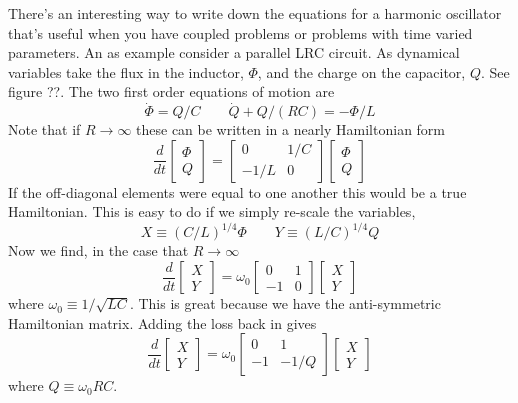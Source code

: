 
There's an interesting way to write down the equations for a harmonic oscillator that's useful when you have coupled problems or problems with time varied parameters.
An as example consider a parallel LRC circuit.
As dynamical variables take the flux in the inductor, $\Phi$, and the charge on the capacitor, $Q$.
See figure ??.
The two first order equations of motion are\begin{equation}
\dot{\Phi}=Q/C\qquad\dot{Q}+Q/(RC)=-\Phi/L \end{equation}
Note that if $R\rightarrow\infty$ these can be written in a nearly Hamiltonian form \begin{equation}
\frac{d}{dt}\left[ \begin{array}{c} \Phi \\ Q\end{array} \right] =
\left[\begin{array}{cc} 0 & 1/C \\ -1/L & 0 \end{array} \right]
\left[\begin{array}{c} \Phi\\ Q\end{array}\right] \end{equation}
If the off-diagonal elements were equal to one another this would be a true Hamiltonian.
This is easy to do if we simply re-scale the variables, \begin{equation}
X \equiv \left( C/L \right)^{1/4} \Phi \qquad Y \equiv \left( L/C \right)^{1/4} Q \end{equation}
Now we find, in the case that $R\rightarrow\infty$ \begin{displaymath}
\frac{d}{dt}\left[ \begin{array}{c} X \\ Y \end{array} \right] = \omega_{0} \left[ \begin{array}{cc} 0 & 1 \\ -1 & 0 \end{array}\right]
\left[ \begin{array}{c} X \\ Y \end{array} \right] \end{displaymath}
where $\omega_{0}\equiv1/\sqrt{LC}$.
This is great because we have the anti-symmetric Hamiltonian matrix.
Adding the loss back in gives \begin{displaymath}
\frac{d}{dt} \left[ \begin{array}{c} X \\ Y \end{array} \right] =
\omega_0 \left[ \begin{array}{cc} 0 & 1 \\ -1 & -1/Q \end{array} \right]
\left[ \begin{array}{c} X \\ Y \end{array} \right] \end{displaymath}
where $Q\equiv \omega_0 R C$.

